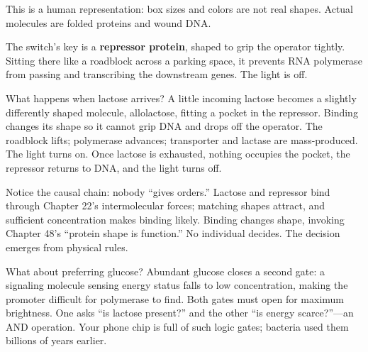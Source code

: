 \begin{center}
\end{center}

This is a human representation: box sizes and colors are not real shapes. Actual molecules are folded proteins and wound DNA.

The switch's key is a \textbf{repressor protein}, shaped to grip the operator tightly. Sitting there like a roadblock across a parking space, it prevents RNA polymerase from passing and transcribing the downstream genes. The light is off.

What happens when lactose arrives? A little incoming lactose becomes a slightly differently shaped molecule, allolactose, fitting a pocket in the repressor. Binding changes its shape so it cannot grip DNA and drops off the operator. The roadblock lifts; polymerase advances; transporter and lactase are mass-produced. The light turns on. Once lactose is exhausted, nothing occupies the pocket, the repressor returns to DNA, and the light turns off.

Notice the causal chain: nobody ``gives orders.'' Lactose and repressor bind through Chapter 22's intermolecular forces; matching shapes attract, and sufficient concentration makes binding likely. Binding changes shape, invoking Chapter 48's ``protein shape is function.'' No individual decides. The decision emerges from physical rules.

What about preferring glucose? Abundant glucose closes a second gate: a signaling molecule sensing energy status falls to low concentration, making the promoter difficult for polymerase to find. Both gates must open for maximum brightness. One asks ``is lactose present?'' and the other ``is energy scarce?''---an AND operation. Your phone chip is full of such logic gates; bacteria used them billions of years earlier.

